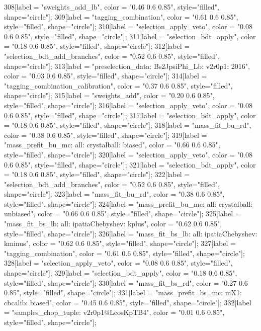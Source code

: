 {	308[label = "sweights_add_lb", color = "0.46 0.6 0.85", style="filled", shape="circle"];
	309[label = "tagging_combination", color = "0.61 0.6 0.85", style="filled", shape="circle"];
	310[label = "selection_apply_veto", color = "0.08 0.6 0.85", style="filled", shape="circle"];
	311[label = "selection_bdt_apply", color = "0.18 0.6 0.85", style="filled", shape="circle"];
	312[label = "selection_bdt_add_branches", color = "0.52 0.6 0.85", style="filled", shape="circle"];
	313[label = "preselection_data\nmode: Bs2JpsiPhi_Lb\nversion: v2r0p1\nyear: 2016", color = "0.03 0.6 0.85", style="filled", shape="circle"];
	314[label = "tagging_combination_calibration", color = "0.37 0.6 0.85", style="filled", shape="circle"];
	315[label = "sweights_add", color = "0.20 0.6 0.85", style="filled", shape="circle"];
	316[label = "selection_apply_veto", color = "0.08 0.6 0.85", style="filled", shape="circle"];
	317[label = "selection_bdt_apply", color = "0.18 0.6 0.85", style="filled", shape="circle"];
	318[label = "mass_fit_bu_rd", color = "0.38 0.6 0.85", style="filled", shape="circle"];
	319[label = "mass_prefit_bu_mc\nmassbin: all\nmassmodel: crystalball\ntrigger: biased", color = "0.66 0.6 0.85", style="filled", shape="circle"];
	320[label = "selection_apply_veto", color = "0.08 0.6 0.85", style="filled", shape="circle"];
	321[label = "selection_bdt_apply", color = "0.18 0.6 0.85", style="filled", shape="circle"];
	322[label = "selection_bdt_add_branches", color = "0.52 0.6 0.85", style="filled", shape="circle"];
	323[label = "mass_fit_bu_rd", color = "0.38 0.6 0.85", style="filled", shape="circle"];
	324[label = "mass_prefit_bu_mc\nmassbin: all\nmassmodel: crystalball\ntrigger: unbiased", color = "0.66 0.6 0.85", style="filled", shape="circle"];
	325[label = "mass_fit_bs_lb\nmassbin: all\nmassmodel: ipatiaChebyshev\ntrigger: kplus", color = "0.62 0.6 0.85", style="filled", shape="circle"];
	326[label = "mass_fit_bs_lb\nmassbin: all\nmassmodel: ipatiaChebyshev\ntrigger: kminus", color = "0.62 0.6 0.85", style="filled", shape="circle"];
	327[label = "tagging_combination", color = "0.61 0.6 0.85", style="filled", shape="circle"];
	328[label = "selection_apply_veto", color = "0.08 0.6 0.85", style="filled", shape="circle"];
	329[label = "selection_bdt_apply", color = "0.18 0.6 0.85", style="filled", shape="circle"];
	330[label = "mass_fit_bs_rd", color = "0.27 0.6 0.85", style="filled", shape="circle"];
	331[label = "mass_prefit_bs_mc\nmassbin: mX1\nmassmodel: cbcalib\ntrigger: biased", color = "0.45 0.6 0.85", style="filled", shape="circle"];
	332[label = "samples_chop_tuple\nversion: v2r0p1@LcosKpTB4", color = "0.01 0.6 0.85", style="filled", shape="circle"];
}

